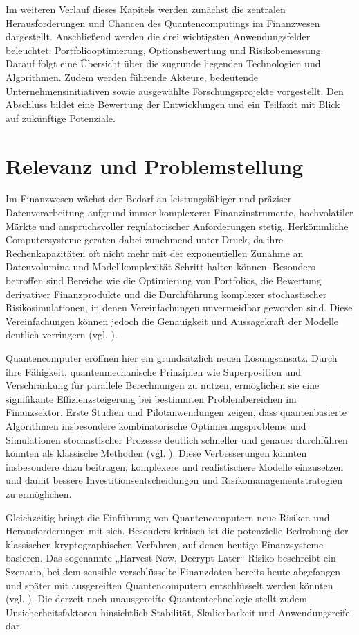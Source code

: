 Im weiteren Verlauf dieses Kapitels werden zunächst die zentralen Herausforderungen und Chancen des Quantencomputings im Finanzwesen dargestellt. Anschließend werden die drei wichtigsten Anwendungsfelder beleuchtet: Portfoliooptimierung, Optionsbewertung und Risikobemessung. Darauf folgt eine Übersicht über die zugrunde liegenden Technologien und Algorithmen. Zudem werden führende Akteure, bedeutende Unternehmensinitiativen sowie ausgewählte Forschungsprojekte vorgestellt. Den Abschluss bildet eine Bewertung der Entwicklungen und ein Teilfazit mit Blick auf zukünftige Potenziale.

\section{Relevanz und Problemstellung}
Im Finanzwesen wächst der Bedarf an leistungsfähiger und präziser Datenverarbeitung aufgrund immer komplexerer Finanzinstrumente, hochvolatiler Märkte und anspruchsvoller regulatorischer Anforderungen stetig. Herkömmliche Computersysteme geraten dabei zunehmend unter Druck, da ihre Rechenkapazitäten oft nicht mehr mit der exponentiellen Zunahme an Datenvolumina und Modellkomplexität Schritt halten können. Besonders betroffen sind Bereiche wie die Optimierung von Portfolios, die Bewertung derivativer Finanzprodukte und die Durchführung komplexer stochastischer Risikosimulationen, in denen Vereinfachungen unvermeidbar geworden sind. Diese Vereinfachungen können jedoch die Genauigkeit und Aussagekraft der Modelle deutlich verringern (vgl. \cite{egger_quantum_2020}).

Quantencomputer eröffnen hier ein grundsätzlich neuen Lösungsansatz. Durch ihre Fähigkeit, quantenmechanische Prinzipien wie Superposition und Verschränkung für parallele Berechnungen zu nutzen, ermöglichen sie eine signifikante Effizienzsteigerung bei bestimmten Problembereichen im Finanzsektor. Erste Studien und Pilotanwendungen zeigen, dass quantenbasierte Algorithmen insbesondere kombinatorische Optimierungsprobleme und Simulationen stochastischer Prozesse deutlich schneller und genauer durchführen könnten als klassische Methoden (vgl. \cite{woerner_quantum_2019}). Diese Verbesserungen könnten insbesondere dazu beitragen, komplexere und realistischere Modelle einzusetzen und damit bessere Investitionsentscheidungen und Risikomanagementstrategien zu ermöglichen.

Gleichzeitig bringt die Einführung von Quantencomputern neue Risiken und Herausforderungen mit sich. Besonders kritisch ist die potenzielle Bedrohung der klassischen kryptographischen Verfahren, auf denen heutige Finanzsysteme basieren. Das sogenannte „Harvest Now, Decrypt Later“-Risiko beschreibt ein Szenario, bei dem sensible verschlüsselte Finanzdaten bereits heute abgefangen und später mit ausgereiften Quantencomputern entschlüsselt werden könnten (vgl. \cite{mosca_et_al_cybersecurity_2018}). Die derzeit noch unausgereifte Quantentechnologie stellt zudem Unsicherheitsfaktoren hinsichtlich Stabilität, Skalierbarkeit und Anwendungsreife dar.

